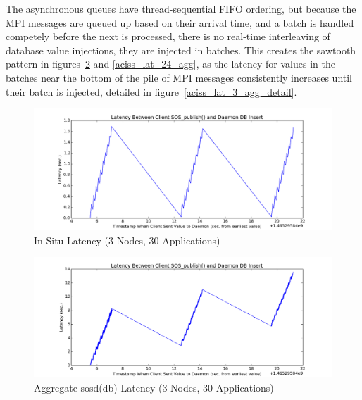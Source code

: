 The asynchronous queues have thread-sequential FIFO ordering, but
because the MPI messages are queued up based on their arrival time,
and a batch is handled competely before the next is processed, there
is no real-time interleaving of database value injections, they are
injected in batches. This creates the sawtooth pattern in
figures~\ref{aciss_lat_3_agg} and \ref{aciss_lat_24_agg}, as the
latency for values in the batches near the bottom of the pile of MPI
messages consistently increases until their batch is injected,
detailed in figure~\ref{aciss_lat_3_agg_detail}.

\begin{figure}[!t]
\centering
\includegraphics[width=5in]{images/aciss_latency_3_situ.png}
\caption{In Situ Latency (3 Nodes, 30 Applications)}
\label{aciss_lat_3_situ}
\end{figure}

\begin{figure}[!t]
\centering
\includegraphics[width=5in]{images/aciss_latency_3_agg.png}
\caption{Aggregate sosd(db) Latency (3 Nodes, 30 Applications)}
\label{aciss_lat_3_agg}
\end{figure}

